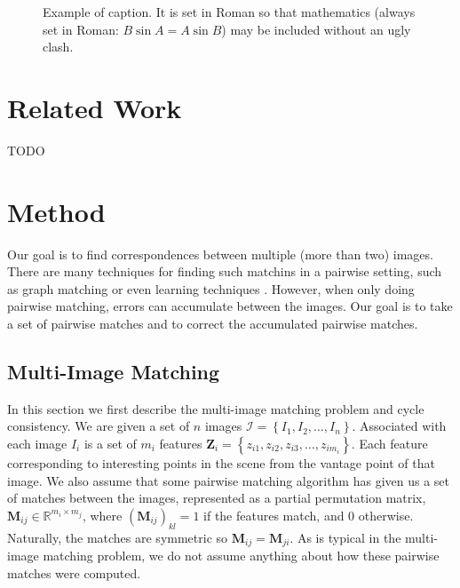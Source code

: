 \documentclass[10pt,twocolumn,letterpaper]{article}
\newcommand{\bR}{\mathbb{R}}
\newcommand{\mat}[1]{\mathbf{#1}}
\begin{document}
\begin{figure}[t]
\begin{center}
  \fbox{\rule{0pt}{2in} \rule{0.9\linewidth}{0pt}}
\end{center}
   \caption{Example of caption.  It is set in Roman so that mathematics
   (always set in Roman: $B \sin A = A \sin B$) may be included without an
   ugly clash.}
\label{fig:long}
\label{fig:onecol}
\end{figure}


\section{Related Work}

TODO



\section{Method}
Our goal is to find correspondences between multiple (more than two) images.
There are many techniques for finding such matchins in a pairwise setting, such as graph matching \cite{suh2015subgraph, hu2016distributable} or even learning techniques \cite{yi2018learning}. However, when only doing pairwise matching, errors can accumulate between the images. Our goal is to take a set of pairwise matches and to correct the accumulated pairwise matches.

\subsection{Multi-Image Matching}
In this section we first describe the multi-image matching problem and cycle consistency.
We are given a set of $n$ images $\mathcal{I} = \left\{ I_1, I_2, \ldots, I_n \right\}$.
Associated with each image $I_i$ is a set of $m_i$ features $\mat{Z}_i = \left\{ z_{i1}, z_{i2}, z_{i3}, \ldots, z_{i m_i} \right\}$.
Each feature corresponding to interesting points in the scene from the vantage point of that image.
We also assume that some pairwise matching algorithm has given us a set of matches between the images, represented as a partial permutation matrix, $\mat{M}_{ij} \in \bR^{m_i \times m_j}$, where $(\mat{M}_{ij})_{kl} = 1$ if the features match, and 0 otherwise.
Naturally, the matches are symmetric so $\mat{M}_{ij} = \mat{M}_{ji}$.
As is typical in the multi-image matching problem, we do not assume anything about how these pairwise matches were computed. 
\end{document}
